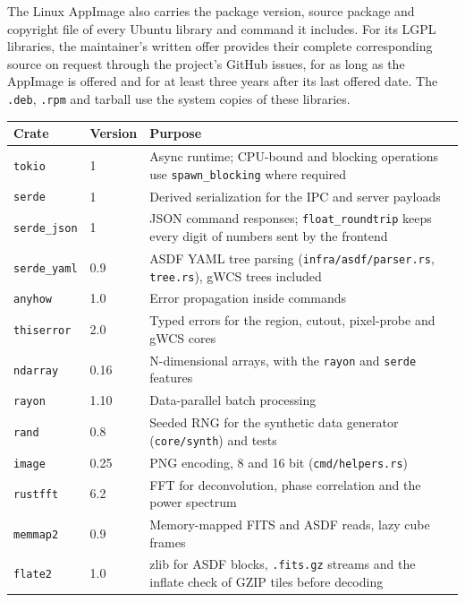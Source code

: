\documentclass[11pt,a4paper]{article}
\newcommand{\code}[1]{\texttt{\small #1}}
\newcommand{\crate}[1]{\texttt{#1}}
\begin{document}
    The Linux AppImage also carries the package version, source package and copyright file of every Ubuntu library and command it includes. For its LGPL libraries, the maintainer's written offer provides their complete corresponding source on request through the project's GitHub issues, for as long as the AppImage is offered and for at least three years after its last offered date. The \code{.deb}, \code{.rpm} and tarball use the system copies of these libraries.

    \begin{table}[htbp]
        \centering
        \small
        \begin{tabularx}{\textwidth}{llX}
    \toprule
    \textbf{Crate} & \textbf{Version} & \textbf{Purpose} \\
    \midrule
    \crate{tokio} & 1 & Async runtime; CPU-bound and blocking operations use \code{spawn\_blocking} where required \\
    \crate{serde} & 1 & Derived serialization for the IPC and server payloads \\
    \crate{serde\_json} & 1 & JSON command responses; \code{float\_roundtrip} keeps every digit of numbers sent by the frontend \\
    \crate{serde\_yaml} & 0.9 & ASDF YAML tree parsing (\code{infra/asdf/parser.rs}, \code{tree.rs}), gWCS trees included \\
    \crate{anyhow} & 1.0 & Error propagation inside commands \\
    \crate{thiserror} & 2.0 & Typed errors for the region, cutout, pixel-probe and gWCS cores \\
    \crate{ndarray} & 0.16 & N-dimensional arrays, with the \code{rayon} and \code{serde} features \\
    \crate{rayon} & 1.10 & Data-parallel batch processing \\
    \crate{rand} & 0.8 & Seeded RNG for the synthetic data generator (\code{core/synth}) and tests \\
    \crate{image} & 0.25 & PNG encoding, 8 and 16 bit (\code{cmd/helpers.rs}) \\
    \crate{rustfft} & 6.2 & FFT for deconvolution, phase correlation and the power spectrum \\
    \crate{memmap2} & 0.9 & Memory-mapped FITS and ASDF reads, lazy cube frames \\
    \crate{flate2} & 1.0 & zlib for ASDF blocks, \code{.fits.gz} streams and the inflate check of GZIP tiles before decoding \\

\end{tabularx}
\end{table}
\end{document}
